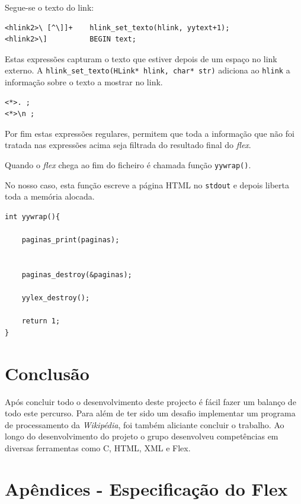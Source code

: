 \documentclass[11pt, a4paper, oneside]{article}
\begin{document}
Segue-se o texto do link:

\begin{verbatim}
<hlink2>\ [^\]]+    hlink_set_texto(hlink, yytext+1);
<hlink2>\]          BEGIN text;
\end{verbatim}

Estas expressões capturam o texto que estiver depois de um espaço no link externo. A \texttt{hlink\_set\_texto(HLink* hlink, char* str)} adiciona ao \texttt{hlink} a informação sobre o texto a mostrar no link.

\begin{verbatim}
<*>. ;
<*>\n ;
\end{verbatim}

Por fim estas expressões regulares, permitem que toda a informação que não foi tratada nas expressões acima seja filtrada do resultado final do \emph{flex}.

Quando o \emph{flex} chega ao fim do ficheiro é chamada função \texttt{yywrap()}.

No nosso caso, esta função escreve a página HTML no \texttt{stdout} e depois liberta toda a memória alocada.

\begin{verbatim}
int yywrap(){

    paginas_print(paginas);

 
    paginas_destroy(&paginas);
    
    yylex_destroy();

    return 1;
}
\end{verbatim}



\newpage
\section{Conclusão}

Após concluir todo o desenvolvimento deste projecto é fácil fazer um balanço de todo este percurso. Para além de ter sido um desafio implementar um programa de processamento da \textit{Wikipédia}, foi também aliciante concluir o trabalho.
Ao longo do desenvolvimento do projeto o grupo desenvolveu competências em diversas ferramentas como C, HTML, XML e Flex. 
\newpage
\section{Apêndices - Especificação do Flex}
\end{document}
